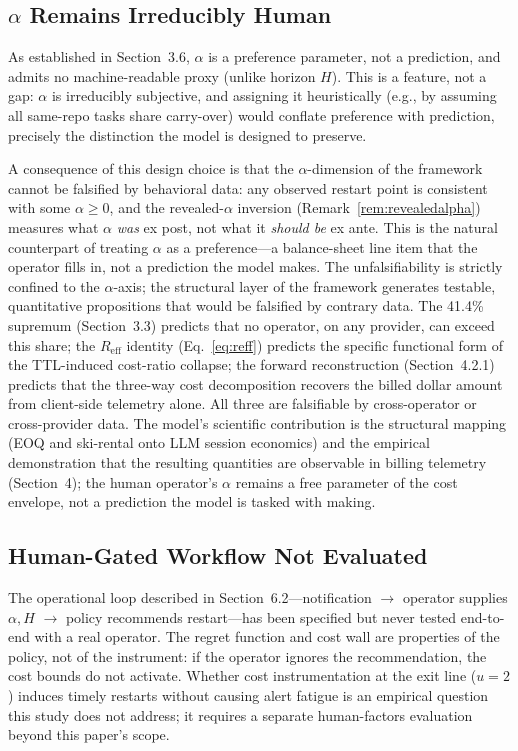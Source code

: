 \documentclass[11pt]{article}
\theoremstyle{definition}
\theoremstyle{remark}
\begin{document}
\subsection{$\alpha$ Remains Irreducibly Human}

As established in Section~3.6, $\alpha$ is a preference parameter, not a prediction, and admits no machine-readable proxy (unlike horizon $H$). This is a feature, not a gap: $\alpha$ is irreducibly subjective, and assigning it heuristically (e.g., by assuming all same-repo tasks share carry-over) would conflate preference with prediction, precisely the distinction the model is designed to preserve.

A consequence of this design choice is that the $\alpha$-dimension of the framework cannot be falsified by behavioral data: any observed restart point is consistent with some $\alpha \ge 0$, and the revealed-$\alpha$ inversion (Remark~\ref{rem:revealedalpha}) measures what $\alpha$ \emph{was} ex post, not what it \emph{should be} ex ante. This is the natural counterpart of treating $\alpha$ as a preference---a balance-sheet line item that the operator fills in, not a prediction the model makes. The unfalsifiability is strictly confined to the $\alpha$-axis; the structural layer of the framework generates testable, quantitative propositions that would be falsified by contrary data. The 41.4\% supremum (Section~3.3) predicts that no operator, on any provider, can exceed this share; the $R_{\text{eff}}$ identity (Eq.~\ref{eq:reff}) predicts the specific functional form of the TTL-induced cost-ratio collapse; the forward reconstruction (Section~4.2.1) predicts that the three-way cost decomposition recovers the billed dollar amount from client-side telemetry alone. All three are falsifiable by cross-operator or cross-provider data. The model's scientific contribution is the structural mapping (EOQ and ski-rental onto LLM session economics) and the empirical demonstration that the resulting quantities are observable in billing telemetry (Section~4); the human operator's $\alpha$ remains a free parameter of the cost envelope, not a prediction the model is tasked with making.

\subsection{Human-Gated Workflow Not Evaluated}

The operational loop described in Section~6.2---notification $\rightarrow$ operator supplies $\alpha, H$ $\rightarrow$ policy recommends restart---has been specified but never tested end-to-end with a real operator. The regret function and cost wall are properties of the policy, not of the instrument: if the operator ignores the recommendation, the cost bounds do not activate. Whether cost instrumentation at the exit line ($u=2$) induces timely restarts without causing alert fatigue is an empirical question this study does not address; it requires a separate human-factors evaluation beyond this paper's scope.
\end{document}
